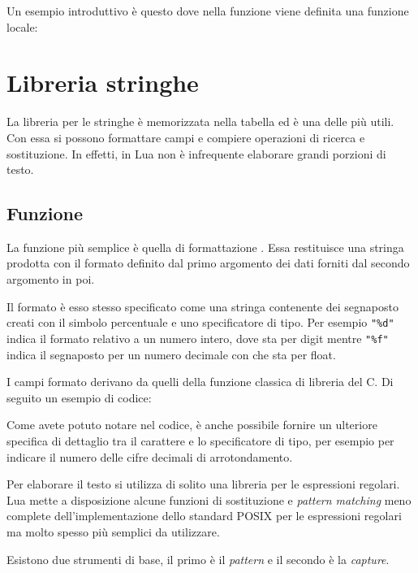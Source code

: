 Un esempio introduttivo è questo dove nella funzione  viene definita una
funzione locale:


\section{Libreria stringhe}

La libreria per le stringhe è memorizzata nella tabella  ed è una
delle più utili. Con essa si possono formattare campi e compiere operazioni di
ricerca e sostituzione. In effetti, in Lua non è infrequente elaborare grandi
porzioni di testo.


\subsection{Funzione }
\label{secFondStringFormat}

La funzione più semplice è quella di formattazione
. Essa restituisce una stringa prodotta
con il formato definito dal primo argomento dei dati forniti dal secondo
argomento in poi.

Il formato è esso stesso specificato come una stringa contenente dei segnaposto
creati con il simbolo percentuale e uno specificatore di tipo. Per esempio
\verb|"%d"| indica il formato relativo a un numero intero, dove  sta per
digit mentre \verb|"%f"| indica il segnaposto per un numero decimale con 
che sta per float.

I campi formato derivano da quelli della funzione classica di libreria
 del C. Di seguito un esempio di codice:

Come avete potuto notare nel codice, è anche possibile fornire un ulteriore
specifica di dettaglio tra il carattere \key{\%} e lo specificatore di tipo, per
esempio per indicare il numero delle cifre decimali di arrotondamento.

Per elaborare il testo si utilizza di solito una libreria per le espressioni
regolari. Lua mette a disposizione alcune funzioni di sostituzione e
\emph{pattern matching} meno complete dell'implementazione dello standard
POSIX per le espressioni regolari ma molto spesso più semplici da utilizzare.

Esistono due strumenti di base, il primo è il \emph{pattern} e il secondo è la
\emph{capture}.


